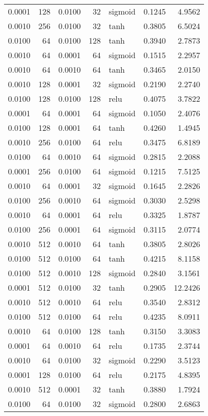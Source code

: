 \begin{table}
\begin{tabular}{rrrrlrr}
0.0001 & 128 & 0.0100 & 32 & sigmoid & 0.1245 & 4.9562 \\
0.0010 & 256 & 0.0100 & 32 & tanh & 0.3805 & 6.5024 \\
0.0100 & 64 & 0.0100 & 128 & tanh & 0.3940 & 2.7873 \\
0.0010 & 64 & 0.0001 & 64 & sigmoid & 0.1515 & 2.2957 \\
0.0010 & 64 & 0.0010 & 64 & tanh & 0.3465 & 2.0150 \\
0.0010 & 128 & 0.0001 & 32 & sigmoid & 0.2190 & 2.2740 \\
0.0100 & 128 & 0.0100 & 128 & relu & 0.4075 & 3.7822 \\
0.0001 & 64 & 0.0001 & 64 & sigmoid & 0.1050 & 2.4076 \\
0.0100 & 128 & 0.0001 & 64 & tanh & 0.4260 & 1.4945 \\
0.0010 & 256 & 0.0100 & 64 & relu & 0.3475 & 6.8189 \\
0.0100 & 64 & 0.0010 & 64 & sigmoid & 0.2815 & 2.2088 \\
0.0001 & 256 & 0.0100 & 64 & sigmoid & 0.1215 & 7.5125 \\
0.0010 & 64 & 0.0001 & 32 & sigmoid & 0.1645 & 2.2826 \\
0.0100 & 256 & 0.0010 & 64 & sigmoid & 0.3030 & 2.5298 \\
0.0010 & 64 & 0.0001 & 64 & relu & 0.3325 & 1.8787 \\
0.0100 & 256 & 0.0001 & 64 & sigmoid & 0.3115 & 2.0774 \\
0.0010 & 512 & 0.0010 & 64 & tanh & 0.3805 & 2.8026 \\
0.0100 & 512 & 0.0100 & 64 & tanh & 0.4215 & 8.1158 \\
0.0100 & 512 & 0.0010 & 128 & sigmoid & 0.2840 & 3.1561 \\
0.0001 & 512 & 0.0100 & 32 & tanh & 0.2905 & 12.2426 \\
0.0010 & 512 & 0.0010 & 64 & relu & 0.3540 & 2.8312 \\
0.0100 & 512 & 0.0100 & 64 & relu & 0.4235 & 8.0911 \\
0.0010 & 64 & 0.0100 & 128 & tanh & 0.3150 & 3.3083 \\
0.0001 & 64 & 0.0010 & 64 & relu & 0.1735 & 2.3744 \\
0.0010 & 64 & 0.0100 & 32 & sigmoid & 0.2290 & 3.5123 \\
0.0001 & 128 & 0.0100 & 64 & relu & 0.2175 & 4.8395 \\
0.0010 & 512 & 0.0001 & 32 & tanh & 0.3880 & 1.7924 \\
0.0100 & 64 & 0.0100 & 32 & sigmoid & 0.2800 & 2.6863 \\

\end{tabular}
\end{table}
